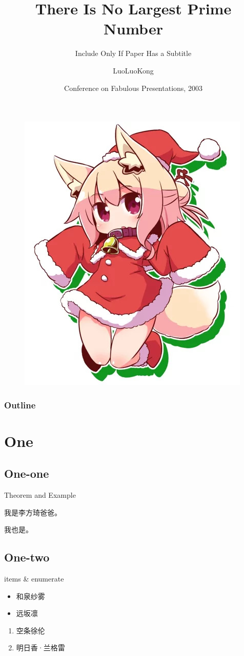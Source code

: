 \documentclass{ctexbeamer}
\title[甘雨快来我身边] %
{There Is No Largest Prime Number}
\subtitle
{Include Only If Paper Has a Subtitle}
\author[Author] %
{LuoLuoKong}
\institute[理学院] %
{
  冯家屯男子电刀大学
 }
\date[CFP 2003] %
{Conference on Fabulous Presentations, 2003}
\begin{document}
  \begin{frame}
    \titlepage
    \begin{figure}[htpb]
      \begin{center}
          \vspace{-0.5cm}
          \includegraphics[width=0.2\linewidth]{pic/pink.jpg}
      \end{center}
    \end{figure}
  \end{frame}
  
  \begin{frame}
    \frametitle{Outline}
    \tableofcontents
  \end{frame}
  
  \section{One}
    \subsection{One-one}
    \begin{frame}{Theorem and Example}
      \begin{theorem}
          我是李方琦爸爸。
      \end{theorem}
      \begin{example}
          我也是。
      \end{example}
    \end{frame}
    
    \subsection{One-two}
    \begin{frame}{items & enumerate}
        \begin{itemize}
            \item 和泉纱雾
            \item 远坂凛
        \end{itemize}
        \vbox{}
        \begin{enumerate}
            \item 空条徐伦
            \item 明日香·兰格雷
        \end{enumerate}
    \end{frame}
  
\end{document}
